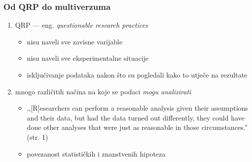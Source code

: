 \documentclass[aspectratio=169]{beamer}
\newcounter{saveenumi}
\newcommand{\seti}{\setcounter{saveenumi}{\value{enumi}}}
\newcommand{\tinycitep}[1]{%
    \bgroup
    \scriptsize
    \citep{#1}
    \egroup}
\begin{document}
\begin{frame}
    \frametitle{Od QRP do multiverzuma}

    \begin{enumerate}
        \item QRP --- eng. \textit{questionable research practices}
            \bgroup
            \scriptsize
            \citep*{johnMeasuringPrevalenceQuestionable2012}
            \egroup

        \pause




        \begin{itemize}
            \item nisu naveli sve zavisne varijable

            
            \item nisu naveli sve eksperimentalne situacije

            \item isključivanje podataka nakon što su pogledali kako to utječe
                na rezultate
        \end{itemize}

        \pause

        \item mnogo različitih načina na koje se podaci \emph{mogu analizirati}
            \tinycitep{gelmanGardenForkingPaths2013}

            \begin{itemize}
                \item ,,[R]esearchers can perform a reasonable analysis
                    given their assumptions and their data, but had the data
                    turned out differently, they could have done other analyses
                    that were just as reasonable in those circumstances.''
                    (str. 1)

                \pause

                \item povezanost statističkih i znanstvenih hipoteza
                    \bgroup
                    \scriptsize
                    \citep[također,][]{yarkoniGeneralizabilityCrisis2019}
                    \egroup
            \end{itemize}

        \seti

    \end{enumerate}
\end{frame}
\end{document}
